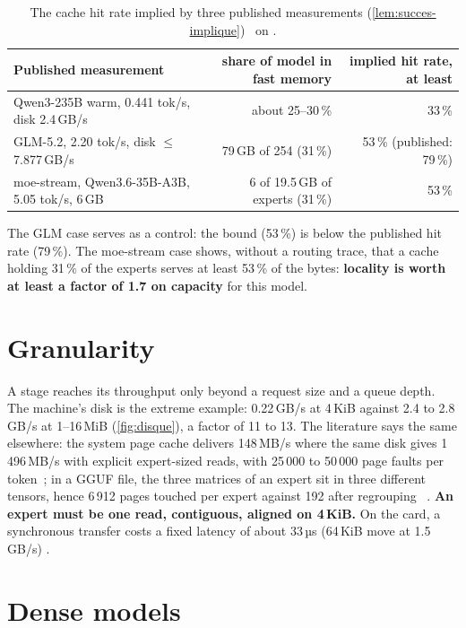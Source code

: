 \begin{table}[ht]
\centering\small
\caption[Locality read from published measurements]{The cache hit rate implied by three published measurements (\cref{lem:succes-implique}) \calc~on \litt.}
\label{tab:succes-implique}
\begin{tabular}{@{}lrr@{}}
\toprule
Published measurement & share of model in fast memory & implied hit rate, at least \\
\midrule
Qwen3-235B warm, 0.441 tok/s, disk 2.4\,GB/s~\cite{cacheable2026} & about 25--30\,\% & 33\,\% \\
GLM-5.2, 2.20 tok/s, disk $\le$ 7.877\,GB/s~\cite{llamapr25294} & 79\,GB of 254 (31\,\%) & 53\,\% (published: 79\,\%) \\
moe-stream, Qwen3.6-35B-A3B, 5.05 tok/s, 6\,GB~\cite{moestream2026} & 6 of 19.5\,GB of experts (31\,\%) & 53\,\% \\
\bottomrule
\end{tabular}
\end{table}

The GLM case serves as a control: the bound (53\,\%) is below the published hit rate (79\,\%). The moe-stream case shows, without a routing trace, that a cache holding 31\,\% of the experts serves at least 53\,\% of the bytes: \textbf{locality is worth at least a factor of 1.7 on capacity} for this model.

\section{Granularity}\label{sec:granularite}

A stage reaches its throughput only beyond a request size and a queue depth. The machine's disk is the extreme example: 0.22\,GB/s at 4\,KiB against 2.4 to 2.8\,GB/s at 1--16\,MiB (\cref{fig:disque}), a factor of 11 to 13. The literature says the same elsewhere: the system page cache delivers 148\,MB/s where the same disk gives 1\,496\,MB/s with explicit expert-sized reads, with 25\,000 to 50\,000 page faults per token~\cite{moestream2026}; in a GGUF file, the three matrices of an expert sit in three different tensors, hence 6\,912 pages touched per expert against 192 after regrouping~\cite{llama27149} \litt. \textbf{An expert must be one read, contiguous, aligned on 4\,KiB.} On the card, a synchronous transfer costs a fixed latency of about 33\,µs (64\,KiB move at 1.5\,GB/s) \mes.

\section{Dense models}\label{sec:denses}

